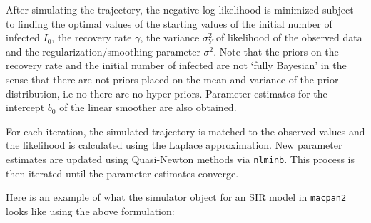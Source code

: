\documentclass[
11pt, %
oneside, %
english, %
singlespacing, %
]{macthesis} %
\begin{document}
After simulating the trajectory, the negative log likelihood is minimized subject to finding the optimal values of the starting values of the initial number of infected \(I_0\), the recovery rate \(\gamma\), the variance \(\sigma^2_Y\) of likelihood of the observed data and the regularization/smoothing parameter \(\sigma^2\). Note that the priors on the recovery rate and the initial number of infected are not `fully Bayesian' in the sense that there are not priors placed on the mean and variance of the prior distribution, i.e no there are no hyper-priors. Parameter estimates for the intercept \(b_0\) of the linear smoother are also obtained.

For each iteration, the simulated trajectory is matched to the observed values and the likelihood is calculated using the Laplace approximation. New parameter estimates are updated using Quasi-Newton methods via \texttt{nlminb}. This process is then iterated until the parameter estimates converge.

Here is an example of what the simulator object for an SIR model in \texttt{macpan2} looks like using the above formulation:
\end{document}
